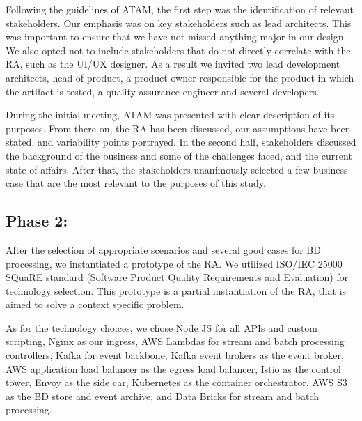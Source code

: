 \documentclass[runningheads]{llncs}
\begin{document}
Following the guidelines of ATAM, the first step was the identification of relevant stakeholders. Our emphasis was on key stakeholders such as lead architects. This was important to ensure that we have not missed anything major in our design. We also opted not to include stakeholders that do not directly correlate with the RA, such as the UI/UX designer. As a result we invited two lead development architects, head of product, a product owner responsible for the product in which the artifact is tested, a quality assurance engineer and several developers. 

During the initial meeting, ATAM was presented with clear description of its purposes. From there on, the RA has been discussed, our assumptions have been stated, and variability points portrayed. In the second half, stakeholders discussed the background of the business and some of the challenges faced, and the current state of affairs. After that, the stakeholders unanimously selected a few business case that are the most relevant to the purposes of this study. 

\subsection{Phase 2:}

After the selection of appropriate scenarios and several good cases for BD processing, we instantiated a prototype of the RA. We utilized ISO/IEC 25000 SQuaRE standard (Software Product Quality Requirements
and Evaluation) \cite{ISO25000} for technology selection. This prototype is a partial instantiation of the RA, that is aimed to solve a context specific problem. 


As for the technology choices, we chose Node JS for all APIs and custom scripting, Nginx as our ingress, AWS Lambdas for stream and batch processing controllers, Kafka for event backbone, Kafka event brokers as the event broker, AWS application load balancer as the egress load balancer, Istio as the control tower, Envoy as the side car, Kubernetes as the container orchestrator, AWS S3 as the BD store and event archive, and Data Bricks for stream and batch processing. 

\end{document}
